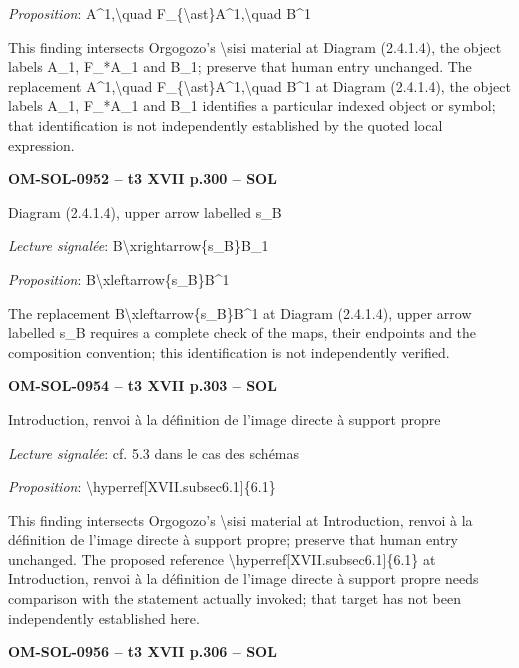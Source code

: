 \emph{Proposition}: A\textasciicircum{}1,\textbackslash{}quad F\_\{\textbackslash{}ast\}A\textasciicircum{}1,\textbackslash{}quad B\textasciicircum{}1\par
This finding intersects Orgogozo's \textbackslash{}sisi material at Diagram (2.4.1.4), the object labels A\_1, F\_*A\_1 and B\_1; preserve that human entry unchanged. The replacement A\textasciicircum{}1,\textbackslash{}quad F\_\{\textbackslash{}ast\}A\textasciicircum{}1,\textbackslash{}quad B\textasciicircum{}1 at Diagram (2.4.1.4), the object labels A\_1, F\_*A\_1 and B\_1 identifies a particular indexed object or symbol; that identification is not independently established by the quoted local expression.\par
\par\noindent\textbf{OM-SOL-0952 -- t3 XVII p.300 -- SOL}\par
Diagram (2.4.1.4), upper arrow labelled s\_B\par
\emph{Lecture signalée}: B\textbackslash{}xrightarrow\{s\_B\}B\_1\par
\emph{Proposition}: B\textbackslash{}xleftarrow\{s\_B\}B\textasciicircum{}1\par
The replacement B\textbackslash{}xleftarrow\{s\_B\}B\textasciicircum{}1 at Diagram (2.4.1.4), upper arrow labelled s\_B requires a complete check of the maps, their endpoints and the composition convention; this identification is not independently verified.\par
\par\noindent\textbf{OM-SOL-0954 -- t3 XVII p.303 -- SOL}\par
Introduction, renvoi à la définition de l'image directe à support propre\par
\emph{Lecture signalée}: cf. 5.3 dans le cas des schémas\par
\emph{Proposition}: \textbackslash{}hyperref[XVII.subsec6.1]\{6.1\}\par
This finding intersects Orgogozo's \textbackslash{}sisi material at Introduction, renvoi à la définition de l'image directe à support propre; preserve that human entry unchanged. The proposed reference \textbackslash{}hyperref[XVII.subsec6.1]\{6.1\} at Introduction, renvoi à la définition de l'image directe à support propre needs comparison with the statement actually invoked; that target has not been independently established here.\par
\par\noindent\textbf{OM-SOL-0956 -- t3 XVII p.306 -- SOL}\par
